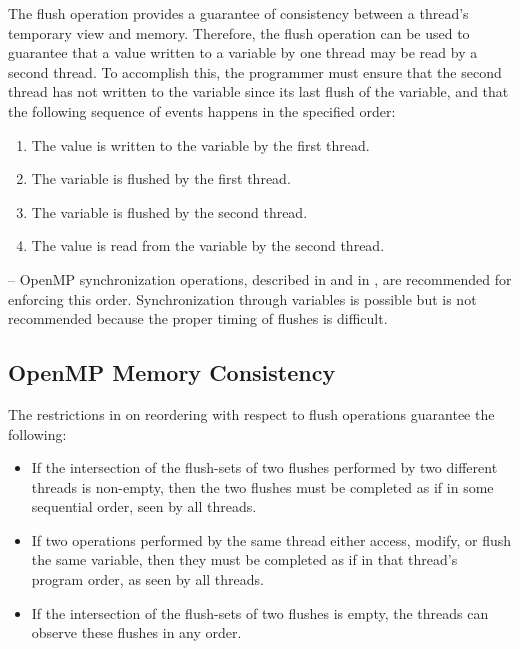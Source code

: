 The flush operation provides a guarantee of consistency between a thread’s temporary
view and memory. Therefore, the flush operation can be used to guarantee that a value 
written to a variable by one thread may be read by a second thread. To accomplish this,
the programmer must ensure that the second thread has not written to the variable since
its last flush of the variable, and that the following sequence of events happens in the
specified order: 

\begin{enumerate}
\item The value is written to the variable by the first thread.   

\item The variable is flushed by the first thread.    

\item The variable is flushed by the second thread.   

\item The value is read from the variable by the second thread.
\end{enumerate}

\notestart
\noteheader – OpenMP synchronization operations, described in 
 and in , 
are recommended for enforcing this order. Synchronization 
through variables is possible but is not recommended because the proper timing of 
flushes is difficult.
\noteend







\subsection{OpenMP Memory Consistency}
\label{subsec:OpenMP Memory Consistency}
The restrictions in  on reordering with respect to flush 
operations guarantee the following: 

\begin{itemize}
\item If the intersection of the flush-sets of two flushes performed by two different threads 
is non-empty, then the two flushes must be completed as if in some sequential order, 
seen by all threads. 

\item If two operations performed by the same thread either access, modify, or flush the 
same variable, then they must be completed as if in that thread's program order, as 
seen by all threads. 

\item If the intersection of the flush-sets of two flushes is empty, the threads can observe 
these flushes in any order.
\end{itemize}

